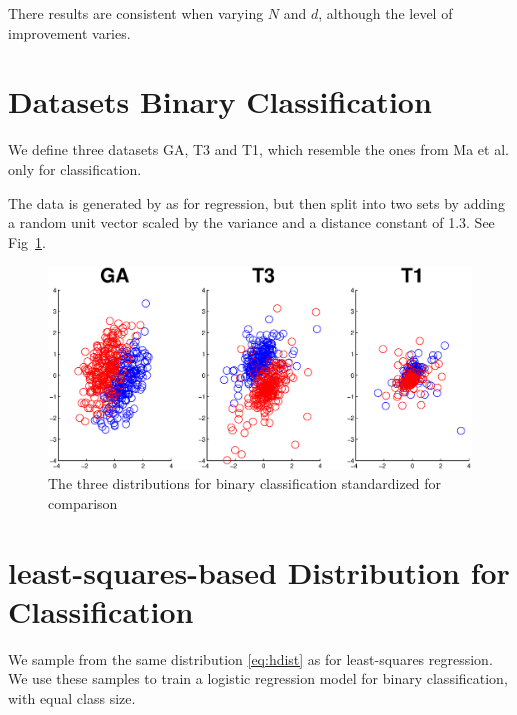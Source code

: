 \documentclass{article}
\begin{document}
There results are consistent when varying $N$ and $d$, although the level of improvement varies.
%
\section{Datasets Binary Classification}
We define three datasets GA, T3 and T1, which resemble the ones from Ma et al. only for classification.

The data is generated by as for regression, but then split into two sets by adding a random unit vector scaled by the variance and a distance constant of 1.3. See Fig~\ref{fig:datasetsClass}.

\begin{figure}[t]
\centering
\includegraphics[width=\linewidth]{images/Data_distributionsClass}
\caption{The three distributions for binary classification standardized for comparison}
\label{fig:datasetsClass}
\end{figure}

\section{least-squares-based Distribution for Classification}

We sample from the same distribution \eqref{eq:hdist} as for least-squares regression. We use these samples to train a logistic regression model for binary classification, with equal class size.
 
  
\end{document}
